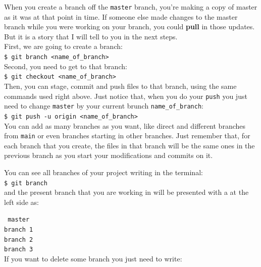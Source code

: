 \documentclass[12pt,a4paper,titlepage,brazil]{article}
\begin{document}
{When you create a branch off the \texttt{master} branch, you’re making a copy of master as it was at that point in time. If someone else made changes to the master branch while you were working on your branch, you could {\bf pull} in those updates. But it is a story that I will tell to you in the next steps.\\

First, we are going to create a branch:\\

\texttt{\$ git branch <name\_of\_branch>}\\

Second, you need to get to that branch:\\

\texttt{\$ git checkout <name\_of\_branch>}\\

Then, you can stage, commit and push files to that branch, using the same commands used right above. Just notice that, when you do your \texttt{push} you just need to change \texttt{master} by your current brunch \texttt{name\_of\_branch}:\\

\texttt{\$ git push -u origin <name\_of\_branch>}\\

You can add as many branches as you want, like direct and different branches from \texttt{main} or even branches starting in other branches. Just remember that, for each branch that you create, the files in that branch will be the same ones in the previous branch as you start your modifications and commits on it.

You can see all branches of your project writing in the terminal:\\

\texttt{\$ git branch}\\

and the present branch that you are working in will be presented with a \* at the left side as:

\texttt{\* master}\\

\texttt{branch 1}\\

\texttt{branch 2}\\

\texttt{branch 3}\\

If you want to delete some branch you just need to write:\\

}
\end{document}
